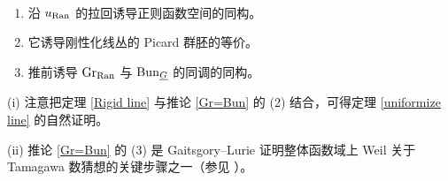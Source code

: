 \begin{cor}\label{Gr=Bun}~
\begin{enumerate}
\item 沿 $u_{\operatorname{Ran}}$ 的拉回诱导正则函数空间的同构。
\item 它诱导刚性化线丛的 Picard 群胚的等价。
\item 推前诱导 ${\operatorname{Gr}}_{\operatorname{Ran}}$ 与 ${\operatorname{Bun}}_{\underline G}$ 的同调的同构。
\end{enumerate}
\end{cor}

\begin{rmk}
(i) 注意把定理 \ref{Rigid line} 与推论 \ref{Gr=Bun} 的 (2) 结合，可得定理 \ref{uniformize line} 的自然证明。

(ii) 推论 \ref{Gr=Bun} 的 (3) 是 Gaitsgory--Lurie 证明整体函数域上 Weil 关于 Tamagawa 数猜想的关键步骤之一（参见 \cite{GL}）。
\end{rmk}
